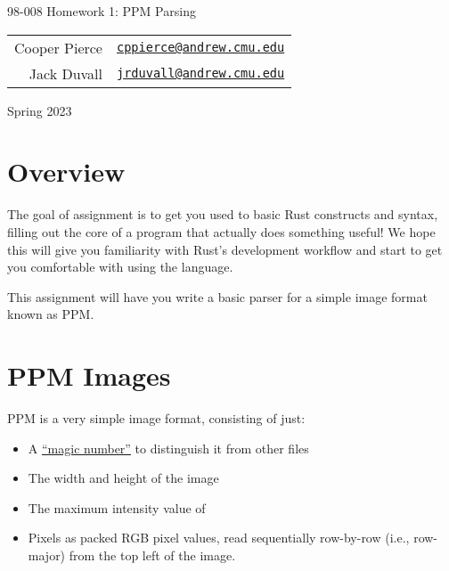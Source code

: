 \documentclass{article}
\newcommand{\longsemester}{Spring 2023}
\newcommand{\deptcode}{98}
\newcommand{\coursecode}{008}
\newcommand{\fullcoursecode}{\deptcode-\coursecode}
\begin{document}
\thispagestyle{empty}
\begin{center}
    \begin{minipage}{.85\textwidth}
        \centering
        {\huge {\fullcoursecode} Homework 1: PPM Parsing}

        \vspace{1em}

        \begin{tabular}{@{}rl@{}}
            Cooper Pierce & \href{mailto:cppierce@andrew.cmu.edu}{\texttt{cppierce@andrew.cmu.edu}} \\
            Jack Duvall & \href{mailto:jrduvall@andrew.cmu.edu}{\texttt{jrduvall@andrew.cmu.edu}} \\
        \end{tabular}

        \vspace{1em}

        \longsemester
    \end{minipage}
\end{center}

\section*{Overview}

The goal of assignment is to get you used to basic Rust constructs and syntax, filling out the core of a program that actually does something useful! We hope this will give you familiarity with Rust's development workflow and start to get you comfortable with using the language.

This assignment will have you write a basic parser for a simple image format known as PPM.

\section*{PPM Images}
PPM is a very simple image format, consisting of just:
\begin{itemize}
    \item A \href{https://en.wikipedia.org/wiki/List_of_file_signatures}{``magic number''} to distinguish it from other files
    \item The width and height of the image
    \item The maximum intensity value of
    \item Pixels as packed RGB pixel values, read sequentially row-by-row
          (i.e., row-major) from the top left of the image.
\end{itemize}
\end{document}
